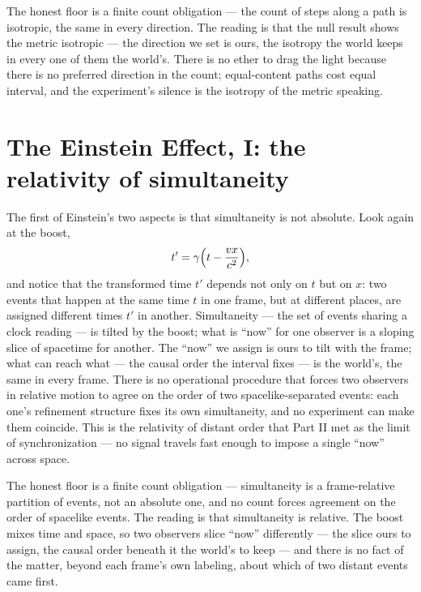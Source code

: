 The honest floor is a finite count obligation --- the count of steps along a path is isotropic, the same in
every direction. The reading is that the null result shows the metric isotropic --- the direction we set is
ours, the isotropy the world keeps in every one of them the world's. There is no ether to drag the light because
there is no preferred direction in the count; equal-content paths cost equal interval, and the
experiment's silence is the isotropy of the metric speaking.

\section{The Einstein Effect, I: the relativity of simultaneity}
\label{se:einstein-simultaneity}

The first of Einstein's two aspects is that simultaneity is not absolute. Look again at the boost,
\begin{equation}
  t' = \gamma\Bigl(t - \frac{vx}{c^2}\Bigr),
\end{equation}
and notice that the transformed time $t'$ depends not only on $t$ but on $x$: two events that happen at the same
time $t$ in one frame, but at different places, are assigned different times $t'$ in another. Simultaneity ---
the set of events sharing a clock reading --- is tilted by the boost; what is ``now'' for one observer is a
sloping slice of spacetime for another. The ``now'' we assign is ours to tilt with the frame; what can reach
what --- the causal order the interval fixes --- is the world's, the same in every frame. There is no
operational procedure that forces two observers in relative
motion to agree on the order of two spacelike-separated events: each one's refinement structure fixes its own
simultaneity, and no experiment can make them coincide. This is the relativity of distant order that Part II
met as the limit of synchronization --- no signal travels fast enough to impose a single ``now'' across space.

The honest floor is a finite count obligation --- simultaneity is a frame-relative partition of events, not an
absolute one, and no count forces agreement on the order of spacelike events. The reading is that simultaneity
is relative. The boost mixes time and space, so two observers slice ``now'' differently --- the slice ours to
assign, the causal order beneath it the world's to keep --- and there is no fact of the matter, beyond each
frame's own labeling, about which of two distant events came first.

